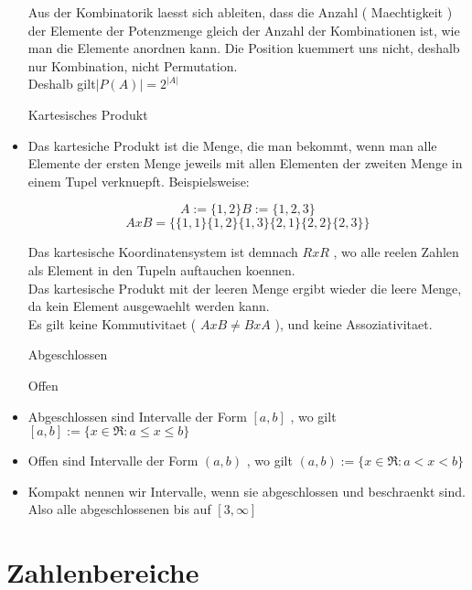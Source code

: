 \documentclass[smallheadings,headsepline,12pt,a4paper]{scrartcl}
\begin{document}
\begin{itemize}
Aus der Kombinatorik laesst sich ableiten, dass die Anzahl ( Maechtigkeit ) der Elemente der Potenzmenge gleich der Anzahl der Kombinationen ist, wie man die Elemente anordnen kann. Die Position kuemmert uns nicht, deshalb nur Kombination, nicht Permutation.  \\

Deshalb gilt$ | P(A) |= 2^{|A|} $\\

\item[Kartesisches Produkt]
\item Das kartesiche Produkt ist die Menge, die man bekommt, wenn man alle Elemente der ersten Menge jeweils mit allen Elementen der zweiten Menge in einem Tupel verknuepft. Beispielsweise: 

$$ A := \{1,2\} B:= \{1,2,3\}  $$
$$ A x B = \{ \{1,1\} \{1,2\} \{1,3\} \{2,1\} \{2,2\} \{2,3\} \} $$

Das kartesische Koordinatensystem ist demnach $ R x R $ , wo alle reelen Zahlen als Element in den Tupeln auftauchen koennen. \\

Das kartesische Produkt mit der leeren Menge ergibt wieder die leere Menge, da kein Element ausgewaehlt werden kann. \\

Es gilt keine Kommutivitaet (  $ A x B \neq B x A $ ), und keine Assoziativitaet.


\item[Abgeschlossen]
\item[Offen]
\item Abgeschlossen sind Intervalle der Form $[a,b]$ , wo gilt $[a,b]:= \{x\in \Re : a \leq x \leq b\}$
\item Offen sind Intervalle der Form $(a,b)$ , wo gilt $(a,b):= \{x\in \Re : a < x < b\}$
\item Kompakt nennen wir Intervalle, wenn sie abgeschlossen und beschraenkt sind. Also alle abgeschlossenen bis auf $ [3,\infty] $








\end{itemize}

\section*{Zahlenbereiche}
\end{document}
